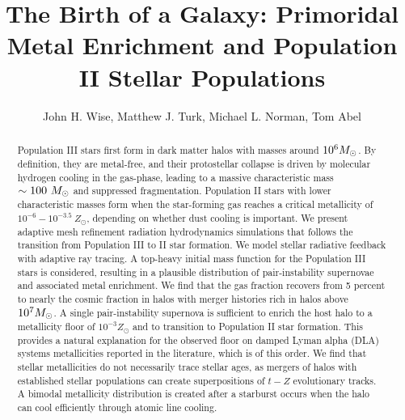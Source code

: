 \documentclass[apjl]{emulateapj}
\newcommand{\Ms}{\ifmmode{M_\odot}\else{$M_\odot$}\fi}
\begin{document}

\title{The Birth of a Galaxy: Primoridal Metal Enrichment and
  Population II Stellar Populations}

\author{John H. Wise, 
  Matthew J. Turk,
  Michael L. Norman,
  Tom Abel}


\begin{abstract}

  Population III stars first form in dark matter halos with masses
  around $10^6 \Ms$.  By definition, they are metal-free, and their
  protostellar collapse is driven by molecular hydrogen cooling in the
  gas-phase, leading to a massive characteristic mass $\sim 100~\Ms$
  and suppressed fragmentation.  Population II stars with lower
  characteristic masses form when the star-forming gas reaches a
  critical metallicity of $10^{-6} - 10^{-3.5}~Z_\odot$, depending on
  whether dust cooling is important.  We present adaptive mesh
  refinement radiation hydrodynamics simulations that follows the
  transition from Population III to II star formation.  We model
  stellar radiative feedback with adaptive ray tracing.  A top-heavy
  initial mass function for the Population III stars is considered,
  resulting in a plausible distribution of pair-instability supernovae
  and associated metal enrichment.  We find that the gas fraction
  recovers from 5 percent to nearly the cosmic fraction in halos with
  merger histories rich in halos above $10^7 \Ms$.  A single
  pair-instability supernova is sufficient to enrich the host halo to
  a metallicity floor of $10^{-3} Z_\odot$ and to transition to
  Population II star formation.  This provides a natural explanation
  for the observed floor on damped Lyman alpha (DLA) systems
  metallicities reported in the literature, which is of this order.
  We find that stellar metallicities do not necessarily trace stellar
  ages, as mergers of halos with established stellar populations can
  create superpositions of $t-Z$ evolutionary tracks.  A bimodal
  metallicity distribution is created after a starburst occurs when
  the halo can cool efficiently through atomic line cooling.

\end{abstract}
\end{document}
